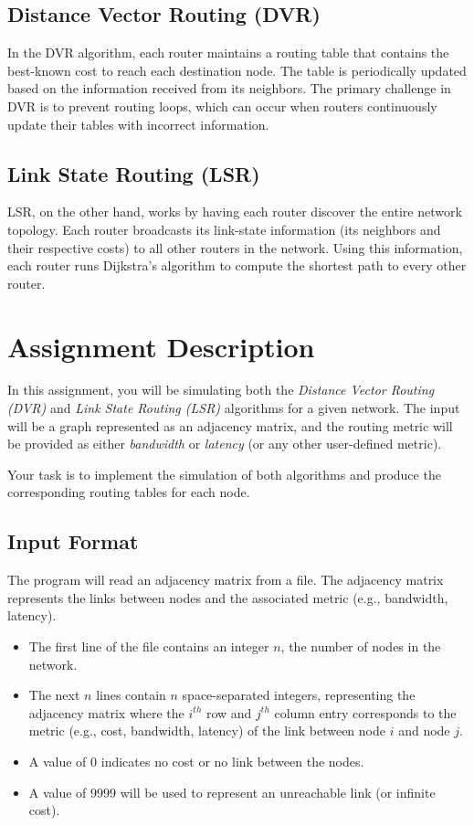 \documentclass[12pt,a4paper]{article}
\begin{document}
\subsection*{Distance Vector Routing (DVR)}
In the DVR algorithm, each router maintains a routing table that contains the best-known cost to reach each destination node. The table is periodically updated based on the information received from its neighbors. The primary challenge in DVR is to prevent routing loops, which can occur when routers continuously update their tables with incorrect information.

\subsection*{Link State Routing (LSR)}
LSR, on the other hand, works by having each router discover the entire network topology. Each router broadcasts its link-state information (its neighbors and their respective costs) to all other routers in the network. Using this information, each router runs Dijkstra's algorithm to compute the shortest path to every other router.

\section*{Assignment Description}
In this assignment, you will be simulating both the \emph{Distance Vector Routing (DVR)} and \emph{Link State Routing (LSR)} algorithms for a given network. The input will be a graph represented as an adjacency matrix, and the routing metric will be provided as either \emph{bandwidth} or \emph{latency} (or any other user-defined metric).

Your task is to implement the simulation of both algorithms and produce the corresponding routing tables for each node.

\subsection*{Input Format}
The program will read an adjacency matrix from a file. The adjacency matrix represents the links between nodes and the associated metric (e.g., bandwidth, latency). 

\begin{itemize}
    \item The first line of the file contains an integer \( n \), the number of nodes in the network.
    \item The next \( n \) lines contain \( n \) space-separated integers, representing the adjacency matrix where the \( i^{th} \) row and \( j^{th} \) column entry corresponds to the metric (e.g., cost, bandwidth, latency) of the link between node \( i \) and node \( j \).
    \item A value of \( 0 \) indicates no cost or no link between the nodes.
    \item A value of \( 9999 \) will be used to represent an unreachable link (or infinite cost).
\end{itemize}
\end{document}
